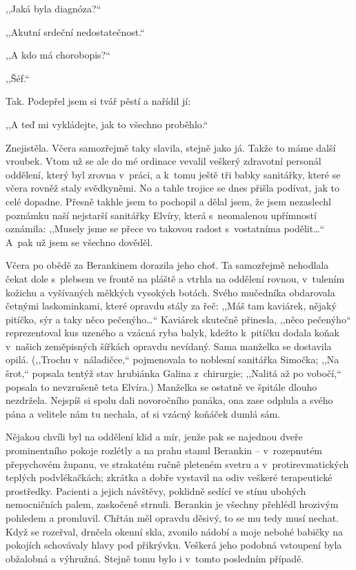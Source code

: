 ,,Jaká byla diagnóza?“

,,Akutní srdeční nedostatečnost.“

,,A kdo má chorobopis?“

,,Šéf.“

Tak. Podepřel jsem si tvář pěstí a nařídil jí:

,,A teď mi vykládejte, jak to všechno proběhlo.“

Znejistěla. Včera samozřejmě taky slavila, stejně jako já. Takže to máme další vroubek. Vtom už se ale do mé ordinace vevalil veškerý zdravotní personál oddělení, který byl zrovna v~práci, a k~tomu ještě tři babky sanitářky, které se včera rovněž staly svědkyněmi. No a tahle trojice se dnes přišla podívat, jak to celé dopadne. Přesně takhle jsem to pochopil a dělal jsem, že jsem nezaslechl poznámku naší nejstarší sanitářky Elvíry, která s~neomalenou upřímností oznámila: ,,Musely jsme se přece vo takovou radost s~vostatníma podělit\ldots“ A~pak už jsem se všechno dověděl.

Včera po obědě za Berankinem dorazila jeho choť. Ta samoz\-řejmě nehodlala čekat dole s~plebsem ve frontě na pláště a vtrhla na oddělení rovnou, v~tulením kožichu a vyšívaných měkkých vysokých botách. Svého mučedníka obdarovala četnými laskominkami, které opravdu stály za řeč: ,,Máš tam kaviárek, nějaký pitíčko, sýr a taky něco pečenýho\ldots“ Kaviárek skutečně přinesla, ,,něco pečenýho“ reprezentoval kus uzeného a vzácná ryba balyk, kdežto k~pitíčku dodala koňak v~našich zeměpisných šířkách opravdu nevídaný. Sama manželka se dostavila opilá. (,,Trochu v~náladičce,“ pojmenovala to noblesní sanitářka Simočka; ,,Na šrot,“ popsala tentýž stav hrubiánka Galina z~chirurgie; ,,Nalitá až po vobočí,“ popsala to nevzrušeně teta Elvíra.) Manželka se ostatně ve špitále dlouho nezdržela. Nejspíš si spolu dali novoročního panáka, ona zase odplula a svého pána a velitele nám tu nechala, ať si vzácný koňáček dumlá sám.

Nějakou chvíli byl na oddělení klid a mír, jenže pak se najednou dveře prominentního pokoje rozlétly a na prahu stanul Berankin – v~rozepnutém přepychovém županu, ve strakatém ručně pleteném svetru a v~protirevmatických teplých podvlékačkách; zkrátka a dobře vystavil na odiv veškeré terapeutické prostředky. Pacienti a jejich návštěvy, poklidně sedící ve stínu ubohých nemocničních palem, zaskočeně strnuli. Berankin je všechny přehlédl hrozivým pohledem a promluvil. Chřtán měl opravdu děsivý, to se mu tedy musí nechat. Když se rozeřval, drnčela okenní skla, zvonilo nádobí a moje nebohé babičky na pokojích schovávaly hlavy pod přikrývku. Veškerá jeho podobná vstoupení byla obžalobná a výhružná. Stejně tomu bylo i v~tomto posledním případě.

